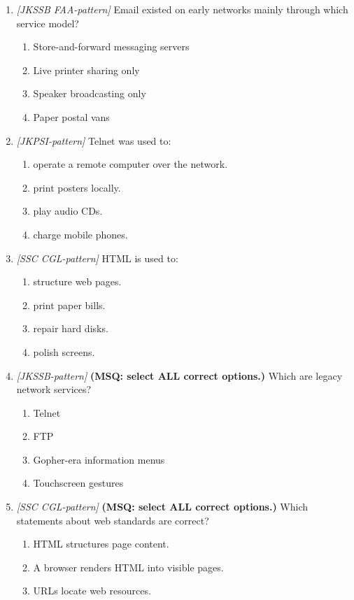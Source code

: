 \begin{enumerate}[label=\textbf{Q\arabic*.}, leftmargin=*]
\item \textit{[JKSSB FAA-pattern]} Email existed on early networks mainly through which service model?
  \begin{enumerate}[label=\Alph*.]
    \item Store-and-forward messaging servers
    \item Live printer sharing only
    \item Speaker broadcasting only
    \item Paper postal vans
  \end{enumerate}
\item \textit{[JKPSI-pattern]} Telnet was used to:
  \begin{enumerate}[label=\Alph*.]
    \item operate a remote computer over the network.
    \item print posters locally.
    \item play audio CDs.
    \item charge mobile phones.
  \end{enumerate}
\item \textit{[SSC CGL-pattern]} HTML is used to:
  \begin{enumerate}[label=\Alph*.]
    \item structure web pages.
    \item print paper bills.
    \item repair hard disks.
    \item polish screens.
  \end{enumerate}
\item \textit{[JKSSB-pattern]} \textbf{(MSQ: select ALL correct options.)} Which are legacy network services?
  \begin{enumerate}[label=\Alph*.]
    \item Telnet
    \item FTP
    \item Gopher-era information menus
    \item Touchscreen gestures
  \end{enumerate}
\item \textit{[SSC CGL-pattern]} \textbf{(MSQ: select ALL correct options.)} Which statements about web standards are correct?
  \begin{enumerate}[label=\Alph*.]
    \item HTML structures page content.
    \item A browser renders HTML into visible pages.
    \item URLs locate web resources.

\end{enumerate}
\end{enumerate}
